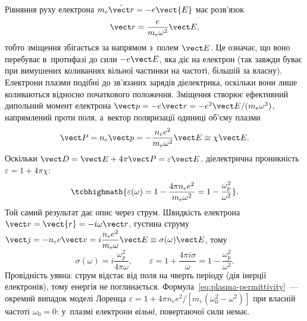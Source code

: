 Рівняння руху електрона $m_e\ddot{\vect r}=-e\vect{E}$ має розв'язок
\begin{equation*}
	\vect r=\frac{e}{m_e\omega^2}\vect E,
\end{equation*}
тобто зміщення збігається за напрямом з~полем $\vect E$. Це означає, що воно перебуває
в~протифазі до сили $-e\vect E$, яка діє на електрон (так завжди буває при вимушених
коливаннях вільної частинки на частоті, більшій за власну). Електрони плазми подібні до
зв'язаних зарядів діелектрика, оскільки вони лише коливаються відносно початкового
положення. Зміщення створює ефективний дипольний момент електрона $\vect p=-e\vect
r=-e^2\vect E/(m_e\omega^2)$, напрямлений проти поля, а~вектор поляризації одиниці об'єму
плазми
\begin{equation*}
	\vect P=n_e\vect p=-\frac{n_ee^2}{m_e\omega^2}\vect E\equiv\chi\vect E.
\end{equation*}
Оскільки $\vect D=\vect E+4\pi\vect P=\varepsilon\vect E$, діелектрична проникність
$\varepsilon=1+4\pi\chi$:
\begin{equation}\label{eq:plasma-permittivity}
	\tcbhighmath{\varepsilon(\omega)=1-\frac{4\pi n_ee^2}{m_e\omega^2}=1-\frac{\omega_p^2}{\omega^2}}.
\end{equation}
Той самий результат дає опис через струм. Швидкість електрона $\vect
v=\dot{\vect{r}}=-i\omega\vect r$, густина струму $\vect j=-n_ee\vect
v=i\dfrac{n_ee^2}{m_e\omega}\vect E\equiv\sigma(\omega)\vect E$, тому
\begin{equation}\label{eq:sigma-collisionless}
	\sigma(\omega)=i\frac{\omega_p^2}{4\pi\omega},\qquad
	\varepsilon=1+\frac{4\pi i\sigma}{\omega}=1-\frac{\omega_p^2}{\omega^2}.
\end{equation}
Провідність уявна: струм відстає від поля на чверть періоду (дія інерції електронів), тому
енергія не поглинається. Формула~\eqref{eq:plasma-permittivity}~--- окремий випадок моделі
Лоренца $\varepsilon=1+4\pi n_ee^2/[m_e(\omega_0^2-\omega^2)]$ при власній частоті
$\omega_0=0$: у~плазмі електрони \emph{вільні}, повертаючої сили немає.

